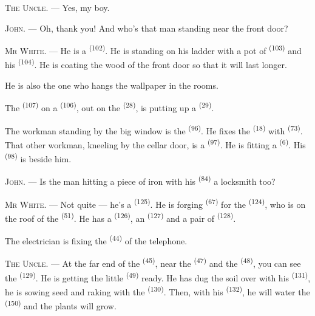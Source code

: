 \textsc{The Uncle}. --- Yes, my boy.

\textsc{John}. --- Oh, thank you! And who's that man standing near the front door?

\VUsaut{3.0mm}
\VUsaut{3.0mm}

\textsc{Mr White}. --- He is a  \textsuperscript{(102)}. He is standing on his
ladder with a pot of  \textsuperscript{(103)} and his
 \textsuperscript{(104)}. He is coating the wood of the front door so
that it will last longer.

He is also the one who hangs the wallpaper in the rooms.

The  \textsuperscript{(107)} on a  \textsuperscript{(106)},
out on the  \textsuperscript{(28)}, is putting up a 
\textsuperscript{(29)}.

The workman standing by the big window is the  \textsuperscript{(96)}. He
fixes the  \textsuperscript{(18)} with
 \textsuperscript{(73)}. That other workman, kneeling by the cellar
door, is a  \textsuperscript{(97)}. He is fitting a 
\textsuperscript{(6)}. His  \textsuperscript{(98)} is beside him.

\textsc{John}. --- Is the man hitting a piece of iron with his
 \textsuperscript{(84)} a locksmith too?

\textsc{Mr White}. --- Not quite --- he's a  \textsuperscript{(125)}. He is
forging  \textsuperscript{(67)} for the
 \textsuperscript{(124)}, who is on the roof of the
 \textsuperscript{(51)}. He has a  \textsuperscript{(126)},
an  \textsuperscript{(127)} and a pair of 
\textsuperscript{(128)}.

The electrician is fixing the  \textsuperscript{(44)} of the telephone.

\VUsaut{3.0mm}

\textsc{The Uncle}. --- At the far end of the  \textsuperscript{(45)}, near the
 \textsuperscript{(47)} and the 
\textsuperscript{(48)}, you can see the  \textsuperscript{(129)}. He is
getting the little  \textsuperscript{(49)} ready. He has dug the soil over with
his  \textsuperscript{(131)}, he is sowing seed and raking with the
 \textsuperscript{(130)}. Then, with his
 \textsuperscript{(132)}, he will water the 
\textsuperscript{(150)} and the plants will grow.

